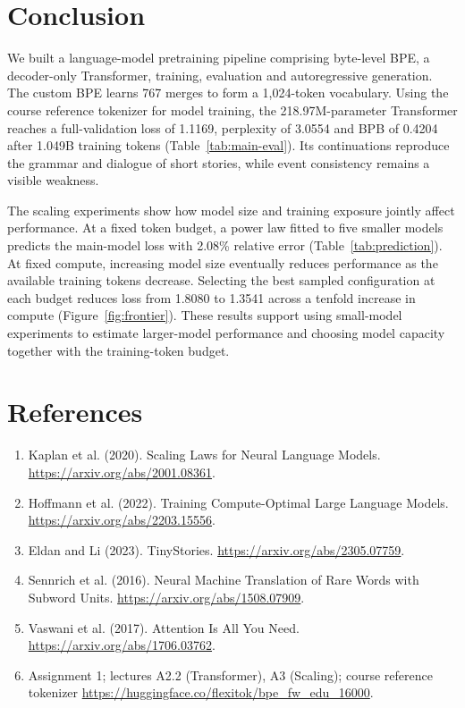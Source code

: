 \documentclass{article}
\begin{document}
\clearpage
\section{Conclusion}
We built a language-model pretraining pipeline comprising byte-level BPE, a decoder-only Transformer, training, evaluation and autoregressive generation. The custom BPE learns 767 merges to form a 1,024-token vocabulary. Using the course reference tokenizer for model training, the 218.97M-parameter Transformer reaches a full-validation loss of 1.1169, perplexity of 3.0554 and BPB of 0.4204 after 1.049B training tokens (Table~\ref{tab:main-eval}). Its continuations reproduce the grammar and dialogue of short stories, while event consistency remains a visible weakness.

The scaling experiments show how model size and training exposure jointly affect performance. At a fixed token budget, a power law fitted to five smaller models predicts the main-model loss with 2.08\% relative error (Table~\ref{tab:prediction}). At fixed compute, increasing model size eventually reduces performance as the available training tokens decrease. Selecting the best sampled configuration at each budget reduces loss from 1.8080 to 1.3541 across a tenfold increase in compute (Figure~\ref{fig:frontier}). These results support using small-model experiments to estimate larger-model performance and choosing model capacity together with the training-token budget.

\normalsize\section*{References}
\begin{enumerate}\small
\item Kaplan et al. (2020). Scaling Laws for Neural Language Models. \url{https://arxiv.org/abs/2001.08361}.
\item Hoffmann et al. (2022). Training Compute-Optimal Large Language Models. \url{https://arxiv.org/abs/2203.15556}.
\item Eldan and Li (2023). TinyStories. \url{https://arxiv.org/abs/2305.07759}.
\item Sennrich et al. (2016). Neural Machine Translation of Rare Words with Subword Units. \url{https://arxiv.org/abs/1508.07909}.
\item Vaswani et al. (2017). Attention Is All You Need. \url{https://arxiv.org/abs/1706.03762}.
\item Assignment 1; lectures A2.2 (Transformer), A3 (Scaling); course reference tokenizer \url{https://huggingface.co/flexitok/bpe_fw_edu_16000}.
\end{enumerate}
\end{document}
